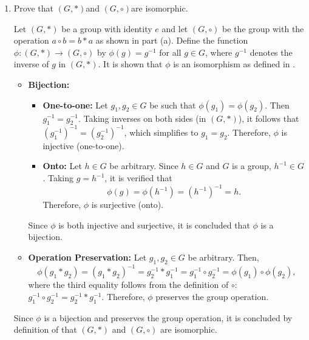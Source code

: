 \begin{enumerate}
\begin{enumerate}
\begin{subprove}
      Since $(G, \circ)$ satisfies all four group axioms, it is concluded by definition of  that $(G, \circ)$ is a group.
    \end{subprove}
    \item Prove that $(G, *)$and $(G, \circ)$are isomorphic.
    \begin{subprove}
      Let $(G, *)$ be a group with identity $e$ and let $(G, \circ)$ be the group with the operation $a \circ b = b * a$ as shown in part (a).
      Define the function $\phi: (G, *) \to (G, \circ)$ by $\phi(g) = g^{-1}$ for all $g \in G$,
      where $g^{-1}$ denotes the inverse of $g$ in $(G, *)$.
      It is shown that $\phi$ is an isomorphism as defined in .
      
      \begin{itemize}
        \item \textbf{Bijection:}
        \begin{itemize}
          \item \textbf{One-to-one:} Let $g_1, g_2 \in G$ be such that $\phi(g_1) = \phi(g_2)$.
          Then $g_1^{-1} = g_2^{-1}$.
          Taking inverses on both sides (in $(G, *)$), it follows that $(g_1^{-1})^{-1} = (g_2^{-1})^{-1}$,
          which simplifies to $g_1 = g_2$.
          Therefore, $\phi$ is injective (one-to-one).
          
          \item \textbf{Onto:} Let $h \in G$ be arbitrary.
          Since $h \in G$ and $G$ is a group, $h^{-1} \in G$.
          Taking $g = h^{-1}$, it is verified that
          \[
            \phi(g) = \phi(h^{-1}) = (h^{-1})^{-1} = h.
          \]
          Therefore, $\phi$ is surjective (onto).
        \end{itemize}
        Since $\phi$ is both injective and surjective, it is concluded that $\phi$ is a bijection.
        
        \item \textbf{Operation Preservation:} Let $g_1, g_2 \in G$ be arbitrary.
        Then,
        \[
          \phi(g_1 * g_2) = (g_1 * g_2)^{-1} = g_2^{-1} * g_1^{-1} = g_1^{-1} \circ g_2^{-1} = \phi(g_1) \circ \phi(g_2),
        \]
        where the third equality follows from the definition of $\circ$: $g_1^{-1} \circ g_2^{-1} = g_2^{-1} * g_1^{-1}$.
        Therefore, $\phi$ preserves the group operation.
      \end{itemize}
      
      Since $\phi$ is a bijection and preserves the group operation,
      it is concluded by definition of  that $(G, *)$ and $(G, \circ)$ are isomorphic.
    \end{subprove}
  \end{enumerate}








\end{enumerate}
